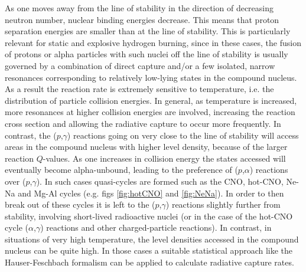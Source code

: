 As one moves away from the line of stability in the direction of decreasing neutron number, nuclear binding energies decrease. This means that proton separation energies are smaller than at the line of stability. This is particularly relevant for static and explosive hydrogen burning, since in these cases, the fusion of protons or alpha particles with such nuclei off the line of stability is usually governed by a combination of direct capture and/or a few isolated, narrow resonances corresponding to relatively low-lying states in the compound nucleus. As a result the reaction rate is extremely sensitive to temperature, i.e. the distribution of particle collision energies. In general, as temperature is increased, more resonances at higher collision energies are involved, increasing the reaction cross section and allowing the radiative capture to occur more frequently. In contrast, the ($p$,$\gamma$) reactions going on very close to the line of stability will access areas in the compound nucleus with higher level density, because of the larger reaction $Q$-values. As one increases in collision energy the states accessed will eventually become alpha-unbound, leading to the preference of ($p$,$\alpha$) reactions over ($p$,$\gamma$). In such cases quasi-cycles are formed such as the CNO, hot-CNO, Ne-Na and Mg-Al cycles (e.g. figs \ref{fig:hotCNO} and \ref{fig:NeNa}). In order to then break out of these cycles it is left to the ($p$,$\gamma$) reactions slightly further from stability, involving short-lived radioactive nuclei (or in the case of the hot-CNO cycle ($\alpha$,$\gamma$) reactions and other charged-particle reactions). In contrast, in situations of very high temperature, the level densities accessed in the compound nucleus can be quite high. In those cases a suitable statistical approach like the Hauser-Feschbach \cite{Hau52} formalism can be applied to calculate radiative capture rates.  

